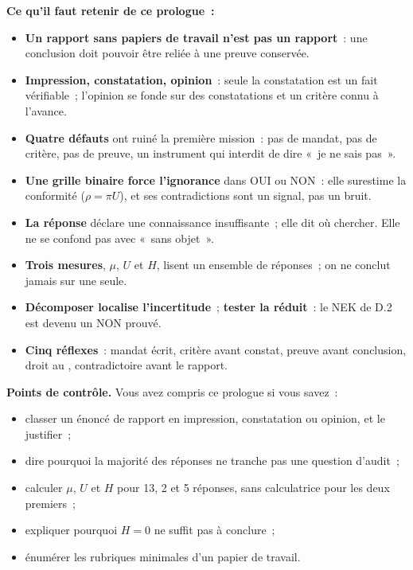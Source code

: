 \separateur

\begin{boxresume}
\textbf{Ce qu'il faut retenir de ce prologue~:}
\begin{itemize}
    \item \textbf{Un rapport sans papiers de travail n'est pas un rapport}~:
          une conclusion doit pouvoir être reliée à une preuve conservée.
    \item \textbf{Impression, constatation, opinion}~: seule la constatation
          est un fait vérifiable~; l'opinion se fonde sur des constatations
          et un critère connu à l'avance.
    \item \textbf{Quatre défauts} ont ruiné la première mission~: pas de
          mandat, pas de critère, pas de preuve, un instrument qui interdit
          de dire «~je ne sais pas~».
    \item \textbf{Une grille binaire force l'ignorance} dans OUI ou NON~:
          elle surestime la conformité ($\rho = \pi U$), et ses
          contradictions sont un signal, pas un bruit.
    \item \textbf{La réponse \NEK{}} déclare une connaissance insuffisante~;
          elle dit où chercher. Elle ne se confond pas avec «~sans objet~».
    \item \textbf{Trois mesures}, $\mu$, $U$ et $H$, lisent un ensemble de
          réponses~; on ne conclut jamais sur une seule.
    \item \textbf{Décomposer localise l'incertitude}~; \textbf{tester la
          réduit}~: le NEK de D.2 est devenu un NON prouvé.
    \item \textbf{Cinq réflexes}~: mandat écrit, critère avant constat,
          preuve avant conclusion, droit au \NEK{}, contradictoire avant le
          rapport.
\end{itemize}
\end{boxresume}

\begin{boxinfo}
\textbf{Points de contrôle.} Vous avez compris ce prologue si vous savez~:
\begin{itemize}
    \item classer un énoncé de rapport en impression, constatation ou
          opinion, et le justifier~;
    \item dire pourquoi la majorité des réponses ne tranche pas une
          question d'audit~;
    \item calculer $\mu$, $U$ et $H$ pour 13, 2 et 5 réponses, sans
          calculatrice pour les deux premiers~;
    \item expliquer pourquoi $H = 0$ ne suffit pas à conclure~;
    \item énumérer les rubriques minimales d'un papier de travail.
\end{itemize}
\end{boxinfo}

